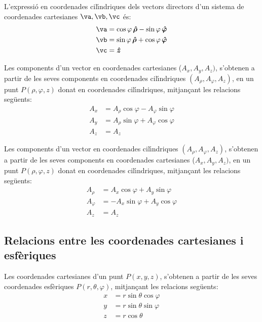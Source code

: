\documentclass[catalan,a4paper,twoside,11pt]{article}
\begin{document}
L'expressi\'{o} en coordenades cil\'{\i}ndriques dels vectors directors d'un sistema de coordenades  cartesianes $\va,\vb,\vc$ \'{e}s:
\begin{subequations}\begin{align}
    \va &=\cos\varphi\,\boldsymbol{\hat{\rho}}-\sin\varphi\,\boldsymbol{\hat{\varphi}} \\
    \vb &=\sin\varphi\,\boldsymbol{\hat{\rho}}+\cos\varphi\,\boldsymbol{\hat{\varphi}} \\
    \vc &=\boldsymbol{\hat{z}}
\end{align}\end{subequations}

Les components d'un vector en coordenades cartesianes ($A_x, A_y, A_z)$, s'obtenen a partir de les seves components en coordenades cil\'{\i}ndriques $(A_\rho, A_\varphi, A_z)$, en un punt $P(\rho,\varphi,z)$ donat en coordenades cil\'{\i}ndriques, mitjan\c{c}ant les relacions seg\"{u}ents:
\begin{subequations}\begin{align}
    A_x &=A_\rho \cos\varphi -A_\varphi\sin\varphi \\
    A_y &=A_\rho\sin\varphi +A_\varphi\cos\varphi\\
    A_z &= A_z
\end{align}\end{subequations}

Les components d'un vector en coordenades cil\'{\i}ndriques $(A_\rho, A_\varphi, A_z)$, s'obtenen a partir de les seves components en coordenades cartesianes ($A_x, A_y, A_z)$, en un punt $P(\rho,\varphi,z)$ donat en coordenades cil\'{\i}ndriques, mitjan\c{c}ant les relacions seg\"{u}ents:
\begin{subequations}\begin{align}
    A_\rho &=  A_x\cos\varphi+A_y\sin\varphi\\
    A_\varphi &= -A_x\sin\varphi+A_y\cos\varphi \\
    A_z &= A_z
\end{align}\end{subequations}


\subsection{Relacions entre les coordenades cartesianes i
esf\`{e}riques}

Les coordenades cartesianes  d'un punt $P(x,y,z)$, s'obtenen a partir
de les seves coordenades esf\`{e}riques $P(r,\theta,\varphi)$,
mitjan\c{c}ant les relacions seg\"{u}ents:
\begin{subequations}\begin{align}
    x &=r\sin\theta\cos\varphi \\ y &=r\sin\theta\sin\varphi \\ z &=r\cos\theta
\end{align}\end{subequations}
\end{document}
